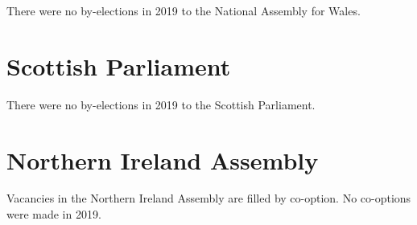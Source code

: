 \documentclass[a4paper,openany]{book}
\begin{document}
There were no by-elections in 2019 to the National Assembly for Wales.

\section{Scottish Parliament}

There were no by-elections in 2019 to the Scottish Parliament.
%
%
%
%
%
%
%

\section{Northern Ireland Assembly}

Vacancies in the Northern Ireland Assembly are filled by co-option.
No co-options were made in 2019.
%
\end{document}
